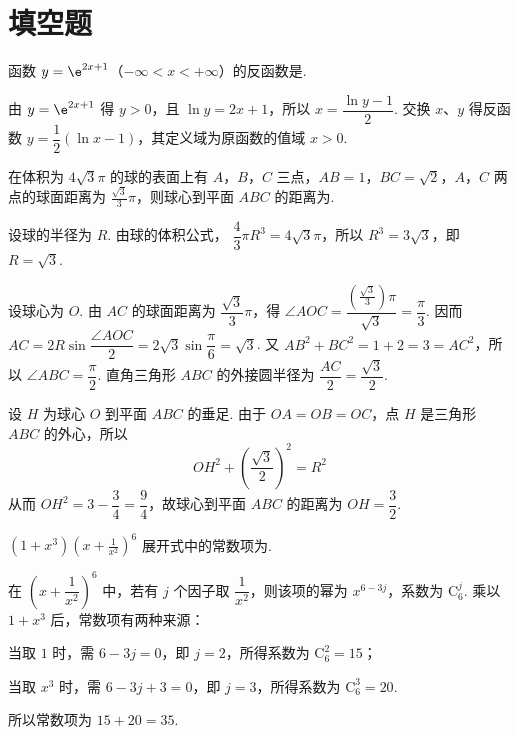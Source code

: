 \section{填空题}

\begin{problem}
函数 \( y = \e^{2x + 1}\)（\(-\infty < x < +\infty\)）的反函数是\fillinblank{}.

\begin{solution}
由 \(y=\e^{2x+1}\) 得 \(y>0\)，且 \(\ln y=2x+1\)，所以
\(x=\dfrac{\ln y-1}{2}\). 交换 \(x\)、\(y\) 得反函数
\(y=\dfrac{1}{2}(\ln x-1)\)，其定义域为原函数的值域 \(x>0\).
\end{solution}
\end{problem}

\begin{problem}
在体积为 \(4\sqrt{3}\pi\) 的球的表面上有 \(A\)，\(B\)，\(C\) 三点，\(AB = 1\)，\(BC = \sqrt{2}\)，\(A\)，\(C\) 两点的球面距离为 \(\frac{\sqrt{3}}{3}\pi\)，则球心到平面 \(ABC\) 的距离为\fillinblank{}.

\begin{solution}
设球的半径为 \(R\). 由球的体积公式，
\(\dfrac{4}{3}\pi R^3=4\sqrt{3}\pi\)，所以 \(R^3=3\sqrt{3}\)，即 \(R=\sqrt{3}\).

设球心为 \(O\). 由 \(AC\) 的球面距离为 \(\dfrac{\sqrt{3}}{3}\pi\)，得
\(\angle AOC=\dfrac{(\frac{\sqrt{3}}{3})\pi}{\sqrt{3}}=\dfrac{\pi}{3}\). 因而
\(AC=2R\sin\dfrac{\angle AOC}{2}=2\sqrt{3}\sin\dfrac{\pi}{6}=\sqrt{3}\).
又 \(AB^2+BC^2=1+2=3=AC^2\)，所以 \(\angle ABC=\dfrac{\pi}{2}\). 直角三角形 \(ABC\) 的外接圆半径为
\(\dfrac{AC}{2}=\dfrac{\sqrt{3}}{2}\).

设 \(H\) 为球心 \(O\) 到平面 \(ABC\) 的垂足. 由于 \(OA=OB=OC\)，点 \(H\) 是三角形 \(ABC\) 的外心，所以
\[
OH^2+\left(\frac{\sqrt{3}}{2}\right)^2=R^2
\]
从而 \(OH^2=3-\dfrac{3}{4}=\dfrac{9}{4}\)，故球心到平面 \(ABC\) 的距离为 \(OH=\dfrac{3}{2}\).
\end{solution}
\end{problem}

\begin{problem}
\((1 + x^{3})\left(x + \frac{1}{x^{2}}\right)^{6}\) 展开式中的常数项为\fillinblank{}.

\begin{solution}
在 \(\left(x+\dfrac{1}{x^2}\right)^6\) 中，若有 \(j\) 个因子取 \(\dfrac{1}{x^2}\)，则该项的幂为
\(x^{6-3j}\)，系数为 \(\mathrm C_6^j\). 乘以 \(1+x^3\) 后，常数项有两种来源：

当取 \(1\) 时，需 \(6-3j=0\)，即 \(j=2\)，所得系数为 \(\mathrm C_6^2=15\)；

当取 \(x^3\) 时，需 \(6-3j+3=0\)，即 \(j=3\)，所得系数为 \(\mathrm C_6^3=20\).

所以常数项为 \(15+20=35\).
\end{solution}
\end{problem}

